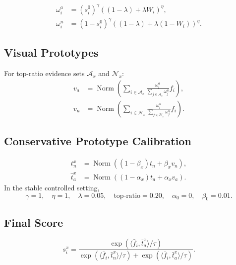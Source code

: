 \begin{align}
  \omega_i^a &=
  (s_i^0)^\gamma\left((1-\lambda)+\lambda W_i\right)^\eta, \\
  \omega_i^n &=
  (1-s_i^0)^\gamma\left((1-\lambda)+\lambda(1-W_i)\right)^\eta .
\end{align}

\subsection{Visual Prototypes}

For top-ratio evidence sets $\mathcal{A}_x$ and $\mathcal{N}_x$:
\begin{align}
  v_a &= \operatorname{Norm}\left(
  \sum_{i\in\mathcal{A}_x}
  \frac{\omega_i^a}{\sum_{j\in\mathcal{A}_x}\omega_j^a} f_i\right), \\
  v_n &= \operatorname{Norm}\left(
  \sum_{i\in\mathcal{N}_x}
  \frac{\omega_i^n}{\sum_{j\in\mathcal{N}_x}\omega_j^n} f_i\right).
\end{align}

\subsection{Conservative Prototype Calibration}

\begin{align}
  t_n^x &= \operatorname{Norm}\left((1-\beta_x)t_n+\beta_x v_n\right),\\
  \hat t_a^x &= \operatorname{Norm}\left((1-\alpha_x)t_a+\alpha_x v_a\right).
\end{align}
In the stable controlled setting,
\[
\gamma=1,\quad \eta=1,\quad \lambda=0.05,\quad
\text{top-ratio}=0.20,\quad
\alpha_0=0,\quad \beta_0=0.01 .
\]

\subsection{Final Score}

\begin{equation}
  s_i^x =
  \frac{\exp(\langle \bar f_i,\bar t_a^x\rangle/\tau)}
       {\exp(\langle \bar f_i,\bar t_n^x\rangle/\tau)+
        \exp(\langle \bar f_i,\bar t_a^x\rangle/\tau)} .
\end{equation}
